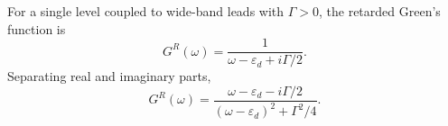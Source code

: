 \documentclass{article}
\begin{document}
For a single level coupled to wide-band leads with $\Gamma>0$, the retarded Green's function is
\begin{equation}
G^R(\omega) = \frac{1}{\omega - \varepsilon_d + i\Gamma/2} .
\label{eq:gr}
\end{equation}
Separating real and imaginary parts,
\begin{equation}
G^R(\omega) = \frac{\omega - \varepsilon_d - i\Gamma/2}{(\omega-\varepsilon_d)^2 + \Gamma^2/4} .
\label{eq:gr2}
\end{equation}
\end{document}
